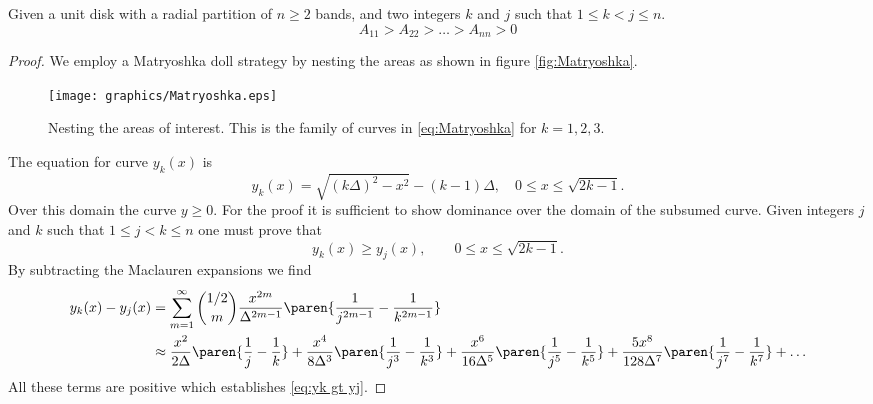 \begin{myTheorem}  
Given a unit disk with a radial partition of $n\ge2$ bands, and two integers $k$ and $j$ such that $1\le k < j \le n$.
  \begin{equation}
    A_{11} > A_{22} > \dots > A_{nn} > 0
  \end{equation}
\end{myTheorem}  %
\begin{proof}  %
We employ a Matryoshka doll strategy by nesting the areas as shown in figure \eqref{fig:Matryoshka}.
\begin{figure}[htbp] %
   \centering
   \texttt{[image: graphics/Matryoshka.eps]} 
   \caption{Nesting the areas of interest. This is the family of curves in \eqref{eq:Matryoshka} for $k=1,2,3$.}
   \label{fig:Matryoshka}
\end{figure}
The equation for curve $y_{k}(x)$ is
  \begin{equation}
    y_{k}(x) = \sqrt{(k \Delta)^{2} - x^{2}} - (k-1)\Delta, \quad 0\le x \le \sqrt{2k-1} .
    \label{eq:Matryoshka}
  \end{equation}
Over this domain the curve $y\ge0$. For the proof it is sufficient to show dominance over the domain of the subsumed curve. Given integers $j$ and $k$ such that $1\le j < k \le n$ one must prove that
  \begin{equation}
    y_{k}(x) \ge y_{j}(x), \qquad 0\le x \le \sqrt{2k-1} .
    \label{eq:yk gt yj}
  \end{equation}
By subtracting the Maclauren expansions we find
  \begin{equation}
  \begin{split}
    y_{k}(x) - y_{j}(x) 
      & = \sum_{m=1}^{\infty} \binom{1/2}{m} \frac{x^{2m}}{\Delta^{2m-1}}\paren{\frac{1}{j^{2m-1}}-\frac{1}{k^{2m-1}}} \\
      & \approx 
      \frac{x^{2}}{2\Delta}\paren{\frac{1}{j}-\frac{1}{k}} 
    + \frac{x^{4}}{8\Delta^{3}}\paren{\frac{1}{j^{3}}-\frac{1}{k^{3}}} 
    + \frac{x^{6}}{16 \Delta^{5}} \paren{\frac{1}{j^{5}}-\frac{1}{k^{5}}} 
    + \frac{5x^{8}}{128 \Delta^{7}} \paren{\frac{1}{j^{7}}-\frac{1}{k^{7}}} 
    + \dots 
  \end{split}
  \end{equation}
All these terms are positive which establishes \eqref{eq:yk gt yj}.
\end{proof}  %

\endinput %